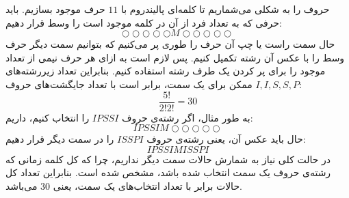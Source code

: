 \p
حروف را به شکلی می‌شماریم تا کلمه‌ای پالیندروم با
$11$
حرف موجود بسازیم. باید حرفی که به تعداد فرد از آن در کلمه موجود است را وسط قرار ‌دهیم:
$$ \bigcirc\bigcirc\bigcirc\bigcirc\bigcirc M \bigcirc\bigcirc\bigcirc\bigcirc\bigcirc $$
حال سمت راست یا چپ آن حرف را طوری پر می‌کنیم که بتوانیم سمت دیگر حرف وسط را با عکس آن رشته تکمیل کنیم. پس لازم است به ازای هر حرف نیمی از تعداد موجود را برای پر کردن یک طرف رشته استفاده کنیم.
 بنابراین تعداد زیررشته‌های ممکن برای یک سمت،
  برابر است با تعداد جایگشت‌های حروف
 $I,I,S,S,P$:
 $$\frac{5!}{2!2!} = 30$$
به طور مثال، اگر رشته‌ی حروف
$IPSSI$
را انتخاب کنیم، داریم:
$$ IPSSIM\bigcirc\bigcirc\bigcirc\bigcirc\bigcirc $$
\p
حال باید عکس آن، یعنی رشته‌ی حروف
$ISSPI$
را در سمت دیگر قرار دهیم:
$$IPSSIMISSPI$$
در حالت کلی نیاز به شمارش حالات سمت دیگر نداریم، چرا که کل کلمه زمانی که رشته‌ی حروف یک سمت انتخاب شده باشد، مشخص شده است. بنابراین تعداد کل حالات برابر با تعداد انتخاب‌های یک سمت، یعنی
$30$
می‌باشد.